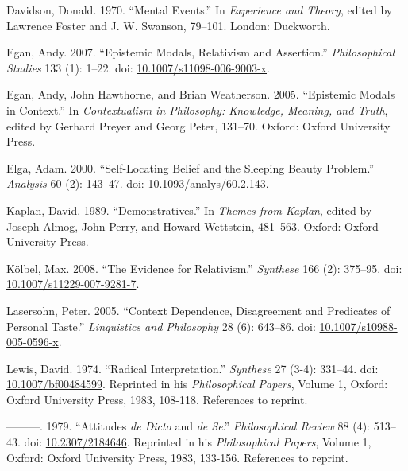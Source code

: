 \documentclass[
  10pt,
  letterpaper,
  DIV=11,
  numbers=noendperiod,
  twoside]{scrartcl}
\newlength{\cslhangindent}
\newenvironment{CSLReferences}[2] %
 {\begin{list}{}{%
  \setlength{\itemindent}{0pt}
  \setlength{\leftmargin}{0pt}
  \setlength{\parsep}{0pt}
  \ifodd #1
   \setlength{\leftmargin}{\cslhangindent}
   \setlength{\itemindent}{-1\cslhangindent}
  \fi
  \setlength{\itemsep}{#2\baselineskip}}}
 {\end{list}}
\begin{document}
\label{refs}
\begin{CSLReferences}{1}{0}
Davidson, Donald. 1970. {``Mental Events.''} In \emph{Experience and
Theory}, edited by Lawrence Foster and J. W. Swanson, 79--101. London:
Duckworth.

Egan, Andy. 2007. {``{Epistemic Modals, Relativism and Assertion}.''}
\emph{Philosophical Studies} 133 (1): 1--22. doi:
\href{https://doi.org/10.1007/s11098-006-9003-x}{10.1007/s11098-006-9003-x}.

Egan, Andy, John Hawthorne, and Brian Weatherson. 2005. {``{Epistemic
Modals in Context}.''} In \emph{Contextualism in Philosophy: Knowledge,
Meaning, and Truth}, edited by Gerhard Preyer and Georg Peter, 131--70.
Oxford: Oxford University Press.

Elga, Adam. 2000. {``Self-Locating Belief and the Sleeping Beauty
Problem.''} \emph{Analysis} 60 (2): 143--47. doi:
\href{https://doi.org/10.1093/analys/60.2.143}{10.1093/analys/60.2.143}.

Kaplan, David. 1989. {``Demonstratives.''} In \emph{Themes from Kaplan},
edited by Joseph Almog, John Perry, and Howard Wettstein, 481--563.
Oxford: Oxford University Press.

Kölbel, Max. 2008. {``The Evidence for Relativism.''} \emph{Synthese}
166 (2): 375--95. doi:
\href{https://doi.org/10.1007/s11229-007-9281-7}{10.1007/s11229-007-9281-7}.

Lasersohn, Peter. 2005. {``Context Dependence, Disagreement and
Predicates of Personal Taste.''} \emph{Linguistics and Philosophy} 28
(6): 643--86. doi:
\href{https://doi.org/10.1007/s10988-005-0596-x}{10.1007/s10988-005-0596-x}.

Lewis, David. 1974. {``Radical Interpretation.''} \emph{Synthese} 27
(3-4): 331--44. doi:
\href{https://doi.org/10.1007/bf00484599}{10.1007/bf00484599}. Reprinted
in his \emph{Philosophical Papers}, Volume 1, Oxford: Oxford University
Press, 1983, 108-118. References to reprint.

---------. 1979. {``Attitudes \emph{de Dicto} and \emph{de Se}.''}
\emph{Philosophical Review} 88 (4): 513--43. doi:
\href{https://doi.org/10.2307/2184646}{10.2307/2184646}. Reprinted in
his \emph{Philosophical Papers}, Volume 1, Oxford: Oxford University
Press, 1983, 133-156. References to reprint.


\end{CSLReferences}
\end{document}
